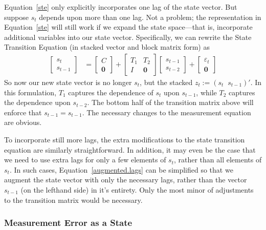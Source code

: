 \documentclass[a4paper,12pt]{article}
\begin{document}
Equation~\ref{ste} only explicitly incorporates one lag of the state
vector. But suppose $s_t$ depends upon more than one lag. Not a problem;
the representation in Equation~\ref{ste} will still work if we expand
the state space---that is, incorporate additional variables into our
state vector. Specifically, we can rewrite the State Transition Equation
(in stacked vector and block matrix form) as 
\begin{align}
  \begin{bmatrix} s_{t} \\ s_{t-1}
  \end{bmatrix}
     &= 
  \begin{bmatrix} C \\ \mathbf{0} 
  \end{bmatrix}
  +\begin{bmatrix} T_1 & T_2 \\ I & \mathbf{0}
  \end{bmatrix}
  \begin{bmatrix} s_{t-1} \\ s_{t-2}
  \end{bmatrix}
  + \begin{bmatrix} 
      \varepsilon_{t}  \\ \mathbf{0}
    \end{bmatrix}
  \label{augmented.lags} 
\end{align}
So now our new state vector is no longer $s_t$, but the stacked $z_t:=(s_t \;\; s_{t-1})'$. In this formulation, $T_1$ captures the dependence of $s_t$ upon $s_{t-1}$, while $T_2$ captures the dependence upon $s_{t-2}$. The bottom half of the transition matrix above will enforce that $s_{t-1}=s_{t-1}$. The necessary changes to the measurement equation are obvious.

To incorporate still more lags, the extra modifications to the state
transition equation are similarly straightforward. In addition, it may
even be the case that we need to use extra lags for only a few elements
of $s_t$, rather than all elements of $s_t$. In such cases,
Equation~\ref{augmented.lags} can be simplified so that we augment the
state vector with only the necessary lags, rather than the vector
$s_{t-1}$ (on the lefthand side) in it's entirety. Only the most minor
of adjustments to the transition matrix would be necessary.


\subsubsection{Measurement Error as a State}
\end{document}
